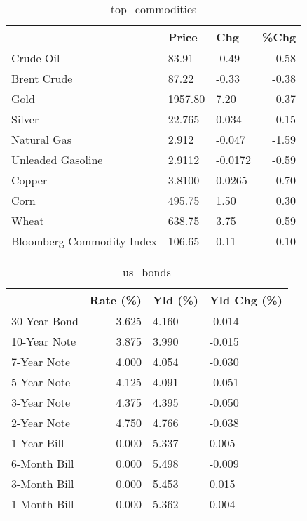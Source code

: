 \documentclass{article}%
\begin{document}
\begin{table}[htbp]%
\caption{top\_commodities}%
\centering%
\begin{adjustbox}{width=1\textwidth}%
\begin{tabular}{lllr}
\toprule
                          &   Price &     Chg &  \%Chg \\
\midrule
               Crude Oil  &   83.91 &   -0.49 & -0.58 \\
             Brent Crude  &   87.22 &   -0.33 & -0.38 \\
                    Gold  & 1957.80 &    7.20 &  0.37 \\
                  Silver  &  22.765 &   0.034 &  0.15 \\
             Natural Gas  &   2.912 &  -0.047 & -1.59 \\
       Unleaded Gasoline  &  2.9112 & -0.0172 & -0.59 \\
                  Copper  &  3.8100 &  0.0265 &  0.70 \\
                    Corn  &  495.75 &    1.50 &  0.30 \\
                   Wheat  &  638.75 &    3.75 &  0.59 \\
Bloomberg Commodity Index &  106.65 &    0.11 &  0.10 \\
\bottomrule
\end{tabular}
%
\end{adjustbox}%
\end{table}

%


\begin{table}[htbp]%
\caption{us\_bonds}%
\centering%
\begin{adjustbox}{width=1\textwidth}%
\begin{tabular}{lrll}
\toprule
             &  Rate (\%) & Yld (\%) & Yld Chg (\%) \\
\midrule
30-Year Bond &     3.625 &   4.160 &      -0.014 \\
10-Year Note &     3.875 &   3.990 &      -0.015 \\
 7-Year Note &     4.000 &   4.054 &      -0.030 \\
 5-Year Note &     4.125 &   4.091 &      -0.051 \\
 3-Year Note &     4.375 &   4.395 &      -0.050 \\
 2-Year Note &     4.750 &   4.766 &      -0.038 \\
 1-Year Bill &     0.000 &   5.337 &       0.005 \\
6-Month Bill &     0.000 &   5.498 &      -0.009 \\
3-Month Bill &     0.000 &   5.453 &       0.015 \\
1-Month Bill &     0.000 &   5.362 &       0.004 \\
\bottomrule
\end{tabular}
%
\end{adjustbox}%
\end{table}
\end{document}
